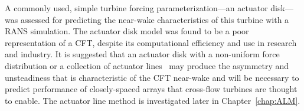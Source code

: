 A commonly used, simple turbine forcing parameterization---an actuator
disk---was assessed for predicting the near-wake characteristics of this turbine
with a RANS simulation. The actuator disk model was found to be a poor
representation of a CFT, despite its computational efficiency and use in
research and industry. It is suggested that an actuator disk with a non-uniform
force distribution or a collection of actuator lines~\cite{Sorensen2002,
    Shamsoddin2014} may produce the asymmetry and unsteadiness that is
characteristic of the CFT near-wake and will be necessary to predict performance
of closely-spaced arrays that cross-flow turbines are thought to enable. The
actuator line method is investigated later in Chapter~\ref{chap:ALM}.
